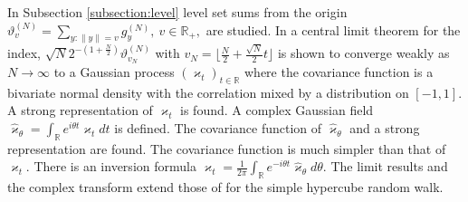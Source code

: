\documentclass[preprint,11pt]{elsarticle}
\theoremstyle{remark}
\def\spin{{[-1,1]}}
\begin{document}
{%
In Subsection \ref{subsection:level} 
level set sums from the origin 
$
\vartheta_v^{(N)}
= \sum_{y:\|y\|=v}g_y^{(N)},\ v\in \mathbb{R}_+,
$
are studied.
In a central limit theorem for the index, $\sqrt{N}2^{-(1+\frac{N}{2})}\vartheta^{(N)}_{v_N}$ with $v_N = \lfloor \frac{N}{2}+ \frac{\sqrt{N}}{2}t\rfloor$
is shown to converge weakly as $N\to \infty$ to a Gaussian process
$(\varkappa_t)_{t\in \mathbb{R}}$ where the covariance function is a bivariate normal density with the correlation mixed by a distribution on $[-1,1]$. 
A strong representation of $\varkappa_t$ is found. A complex Gaussian field $\widehat{\varkappa}_\theta = \int_{\mathbb{R}} e^{i\theta t}\varkappa_t dt$ is defined. The covariance function of $\widehat{\varkappa}_\theta$ and a strong representation are found. The covariance function is much simpler than that of $\varkappa_t $.
There is an inversion formula 
$
\varkappa_t = \frac{1}{2\pi}\int_{\mathbb{R}} e^{-i\theta t}\widehat{\varkappa}_\theta d\theta
$.
 The limit results and the complex transform extend those of \cite{CG2025} for the simple hypercube random walk.
}
\end{document}
